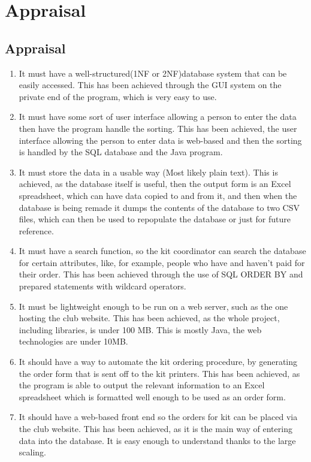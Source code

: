\documentclass[
11pt, %
a4paper, %
oneside, %
headinclude,footinclude, %
BCOR5mm, %
]{scrartcl}
\begin{document}
\section{Appraisal}
\subsection{Appraisal}
\begin{enumerate}
	\item It must have a well-structured(1NF or 2NF)database system that can be easily accessed. This has been achieved through the GUI system on the private end of the program, which is very easy to use.
	\item It must have some sort of user interface allowing a person to enter the data then have the program handle the sorting. This has been achieved, the user interface allowing the person to enter data is web-based and then the sorting is handled by the SQL database and the Java program.
	\item It must store the data in a usable way (Most likely plain text). This is achieved, as the database itself is useful, then the output form is an Excel spreadsheet, which can have data copied to and from it, and then when the database is being remade it dumps the contents of the database to two CSV files, which can then be used to repopulate the database or just for future reference.
	\item It must have a search function, so the kit coordinator can search the database for certain attributes, like, for example, people who have and haven’t paid for their order. This has been achieved through the use of SQL ORDER BY and prepared statements with wildcard operators.
	\item It must be lightweight enough to be run on a web server, such as the one hosting the club website. This has been achieved, as the whole project, including libraries, is under 100 MB. This is mostly Java, the web technologies are under 10MB. 
	\item It should have a way to automate the kit ordering procedure, by generating the order form that is sent off to the kit printers. This has been achieved, as the program is able to output the relevant information to an Excel spreadsheet which is formatted well enough to be used as an order form.
	\item It should have a web-based front end so the orders for kit can be placed via the club website. This has been achieved, as it is the main way of entering data into the database. It is easy enough to understand thanks to the large scaling. 

\end{enumerate}
\end{document}

